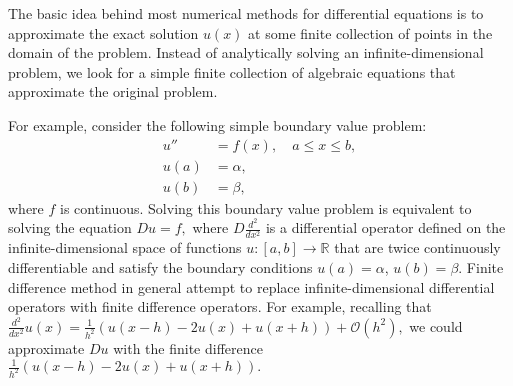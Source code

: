 \label{lab:finitedifference2}

% 
% 

The basic idea behind most numerical methods for differential equations is to 
approximate the exact solution $u(x)$ at some finite collection of points in the 
domain of the problem. Instead of analytically solving an infinite-dimensional
problem, we look for a simple finite collection of algebraic equations that approximate
 the original problem.

For example, consider the following simple boundary value problem:
\begin{align}
u'' &= f(x), \quad a \leq x \leq b,\nonumber\\
	u(a) &= \alpha,\nonumber\\
	u(b) &= \beta,
\end{align}
where $f$ is continuous. %
Solving this boundary
value problem is equivalent to solving the equation $Du = f,$
where $D\frac{d^2}{dx^2}$ is a differential operator defined on the infinite-dimensional space 
of functions $u:[a,b] \to \mathbb{R}$ that are twice continuously differentiable and 
satisfy the boundary conditions $u(a) = \alpha$, $u(b) = \beta$. Finite difference method in general attempt to replace infinite-dimensional differential operators with finite difference operators. For example, recalling that $\frac{d^2}{dx^2}u(x) = \frac{1}{h^2}\left(u(x-h) -2u(x) + u(x+h)\right) + \mathcal{O}(h^2),$ we could  approximate $Du$ with the finite difference $\frac{1}{h^2}\left(u(x-h) -2u(x) + u(x+h)\right).$


